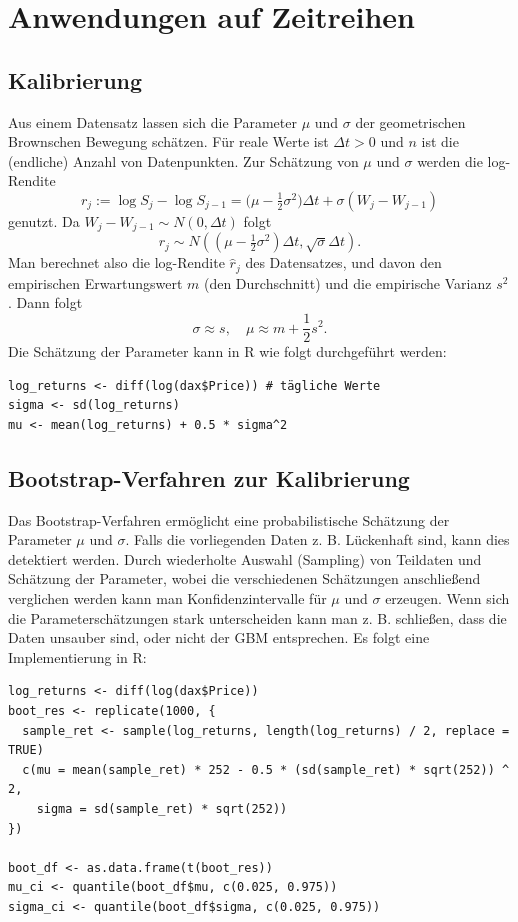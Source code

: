 \section{Anwendungen auf Zeitreihen}

\subsection{Kalibrierung}
Aus einem Datensatz lassen sich die Parameter $\mu$ und $\sigma$ der
geometrischen Brownschen Bewegung schätzen. 
Für reale Werte ist $\Delta t \gt 0$ und $n$ ist die (endliche) Anzahl von Datenpunkten. 
Zur Schätzung von $\mu$ und $\sigma$ werden die log-Rendite
$$r_j := \log S_j - \log S_{j-1}= \big(\mu - \tfrac12 \sigma^2\big)\Delta t + \sigma (W_j - W_{j-1})$$
genutzt. Da $W_j - W_{j-1} \sim N(0, \Delta t)$ folgt
$$r_j \sim N((\mu - \tfrac12 \sigma^2)\Delta t, \sqrt{\sigma} \Delta t).$$
Man berechnet also die log-Rendite $\hat r_j$ des Datensatzes, 
und davon den empirischen Erwartungswert $m$ (den Durchschnitt) und die empirische Varianz $s^2$. 
Dann folgt $$\sigma \approx s,\quad \mu \approx m + \frac{1}{2} s^2.$$
Die Schätzung der Parameter kann in R wie folgt durchgeführt werden:

\begin{lstlisting}
log_returns <- diff(log(dax$Price)) # tägliche Werte
sigma <- sd(log_returns)
mu <- mean(log_returns) + 0.5 * sigma^2
\end{lstlisting}


\subsection{Bootstrap-Verfahren zur Kalibrierung}
Das Bootstrap-Verfahren ermöglicht eine probabilistische Schätzung der Parameter $\mu$ und $\sigma$. Falls die vorliegenden Daten z. B.
Lückenhaft sind, kann dies detektiert werden. Durch wiederholte Auswahl (Sampling) von Teildaten und Schätzung der Parameter, wobei die verschiedenen Schätzungen anschließend verglichen werden kann man Konfidenzintervalle für $\mu$ und $\sigma$ erzeugen. 
Wenn sich die Parameterschätzungen stark unterscheiden kann man z. B. schließen, dass die Daten unsauber sind, oder nicht der GBM entsprechen. Es folgt eine Implementierung in R:

\begin{lstlisting}
log_returns <- diff(log(dax$Price))
boot_res <- replicate(1000, {
  sample_ret <- sample(log_returns, length(log_returns) / 2, replace = TRUE)
  c(mu = mean(sample_ret) * 252 - 0.5 * (sd(sample_ret) * sqrt(252)) ^ 2,
    sigma = sd(sample_ret) * sqrt(252))
})

boot_df <- as.data.frame(t(boot_res))
mu_ci <- quantile(boot_df$mu, c(0.025, 0.975))
sigma_ci <- quantile(boot_df$sigma, c(0.025, 0.975))
\end{lstlisting}

